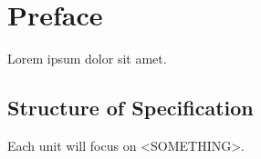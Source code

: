 \chapter*{Preface}
Lorem ipsum dolor sit amet.


\section*{Structure of Specification}
Each unit will focus on <SOMETHING>.
